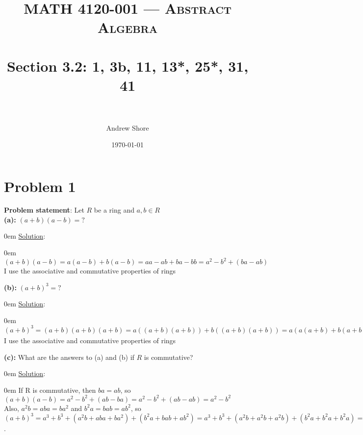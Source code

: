 \documentclass{article} %
\title{ 
\normalfont \normalsize 
\textsc{MATH 4120-001 --- Abstract Algebra} \\
\horrule{0.5pt} \\[0cm] %
\huge Section 3.2: 1, 3b, 11, 13*, 25*, 31, 41  \\ %
\horrule{2pt} \\[0cm] %
}
\author{Andrew Shore} %
\date{\normalsize\today} %
\begin{document}
\maketitle %

\section*{Problem 1}


\textbf{Problem statement}: Let $R$ be a ring and $a, b \in R$
\\

 
\textbf{(a): }$(a + b)(a-b) = ?$ \\
\begin{addmargin}[1em]{0em}
\underline{Solution}:
\begin{addmargin}[1em]{0em}
$(a + b)(a - b) = a(a - b) + b(a - b) = aa - ab + ba - bb = 
a^2 - b^2 + (ba - ab)$
\\I use the associative and commutative properties of rings
\\
\end{addmargin}
\end{addmargin}    

\textbf{(b): } $(a + b)^3 = ?$ \\
\begin{addmargin}[1em]{0em}
\underline{Solution}:
\begin{addmargin}[1em]{0em}
$(a+b)^3 = (a+b)(a+b)(a+b)= a((a+b)(a+b)) + b((a+b)(a+b)) = a(a(a+b) + b(a+b)) + b(a(a+b)+b(a+b)) = a(aa + ab + ba + bb) + b(aa + ab + ba + bb) = aa^2 + ab^2 + aba + aab + ba^2 + bab + bba + bb^2 = a^3 + b^3 + (a^2b + aba + ba^2) + (b^2a + bab + ab^2)$
\\I use the associative and commutative properties of rings
\\
\end{addmargin}
\end{addmargin}

\textbf{(c): }What are the answers to (a) and (b) if $R$ is commutative? \\
\begin{addmargin}[1em]{0em}
\underline{Solution}:
\begin{addmargin}[1em]{0em}
If R is commutative, then $ba = ab$, so $(a+b)(a-b) = a^2 - b^2 + (ab - ba) = a^2 - b^2 + (ab - ab) = a^2 - b^2$
\\Also, $a^2b = aba = ba^2$ and $b^2a = bab = ab^2$, so $(a+b)^3 = a^3 + b^3 + (a^2b + aba + ba^2) + (b^2a + bab + ab^2) = a^3 + b^3 + (a^2b + a^2b + a^2b) + (b^2a + b^2a + b^2a) = a^3 + b^3 + 3a^2b + 3b^2a$.
\end{addmargin}
\end{addmargin}
\end{document}
